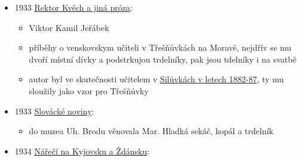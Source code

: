 \begin{itemize}
  \begin{itemize}
  \tightlist
  \item
    článek Znáte trdelníky? autorka M. Ú (čili M. Úlehlová-Tilschová)
  \item
    snad ještě pamatujete na vysoké trdlovce nebo Baumkuchen, které
    kdysi byly v cukrárnách
  \item
    pak popisuje západoslovenské trdelníky
  \item
    recept (mouka, máslo, sádlo, 5 žloutků, droždí, cukr, mlíko), sypaný
    mandlema, potíraný máslem a bílkama
  \item
    krájí se na kolečka (to je rozdíl oproti tomu, co popisuje v
    pozdějších knížkách, kde se odmotávají)
  \end{itemize}
\item
  1933
  \href{https://ceskadigitalniknihovna.cz/view/uuid:60eab9a0-0be7-11ed-8635-005056827e52?page=uuid\%3A8ee6bb86-db3e-4211-a60a-d927a201dc69&fulltext=trdeln*&source=mzk}{Rektor
  Kvěch a jiná próza}:

  \begin{itemize}
  \tightlist
  \item
    Viktor Kamil Jeřábek
  \item
    příběhy o venskovskym učiteli v Třešňůvkách na Moravě, nejdřív se mu
    dvoří místní dívky a podstrkujou trdelníky, pak jsou tdelníky i na
    svatbě
  \item
    autor byl ve skutečnosti učitelem v
    \href{https://kramerius.lib.cas.cz/view/uuid:48220bc0-4294-11e2-b246-005056827e52?page=uuid\%3A04efbdca-01ec-4111-8df2-32a5f52f4c16}{Silůvkách
    v letech 1882-87}, ty mu sloužily jako vzor pro Třešňůvky
  \end{itemize}
\item
  1933
  \href{https://www.digitalniknihovna.cz/vkol/uuid/uuid:349c38c2-fadc-4992-a172-9aacc818e434}{Slovácké
  noviny}:

  \begin{itemize}
  \tightlist
  \item
    do muzea Uh. Brodu věnovala Mar. Hladká sekáč, kopál a trdelník
  \end{itemize}
\item
  1934
  \href{https://ceskadigitalniknihovna.cz/view/uuid:e1259815-3caf-4b6b-af1d-8ada80900484?page=uuid\%3A8bb1ba0a-525b-11e5-a788-0050569d679d&fulltext=trdeln\%C3\%ADk\%20OR\%20trdeln\%C3\%ADky\%20OR\%20trdeln\%C3\%ADk\%C5\%AF&source=mzk}{Nářečí
  na Kyjovsku a Ždánsku}:


\end{itemize}
